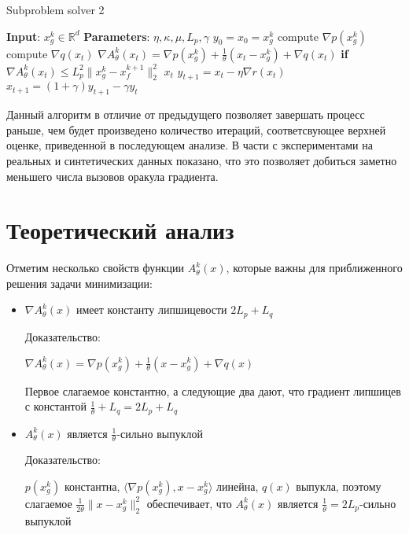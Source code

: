 \documentclass[a4paper,12pt]{extarticle}
\def\<#1,#2>{\langle #1,#2\rangle}
\newcommand{\norm}[1]{\|#1\|_{2}}
\newcommand{\sqn}[1]{\norm{#1}^2}
\begin{document}
\begin{algorithm}[]
    \caption{Subproblem solver 2}
    \begin{algorithmic}[1]

    \STATE{} \textbf{Input}: $x_g^k \in \mathbb{R}^d$
    \STATE{} \textbf{Parameters}: $\eta, \kappa, \mu, L_p, \gamma$
    \STATE{} $y_0 = x_0 = x_g^k$
    \STATE{} compute $\nabla p(x_g^k)$
    \STATE{} compute $\nabla q(x_t)$
    \STATE{} $\nabla A_{\theta}^k(x_t) = \nabla p(x_g^k) + \frac{1}{\theta}(x_t - x_g^k) + \nabla q(x_t)$
    \STATE{} \textbf{if} $\nabla A_{\theta}^k(x_t) \leq L_p^2 \sqn{x_g^k- x_f^{k+1}}$ 
    \RETURN{} $x_{t}$
    \vspace{2ex}
    \STATE{} $y_{t + 1} = x_{t} - \eta \nabla r(x_t)$
    \STATE{} $x_{t + 1} = (1 + \gamma)y_{t+1} - \gamma y_{t}$
    \vspace{0.5ex}
    \ENDFOR{}
    \end{algorithmic}
\end{algorithm}


Данный алгоритм в отличие от предыдущего позволяет завершать процесс раньше,
чем будет произведено количество итераций, соответсвующее верхней оценке,
приведенной в последующем анализе. В части с экспериментами на реальных и синтетических
данных показано, что это позволяет добиться заметно меньшего числа вызовов
оракула градиента. 

\section{Теоретический анализ}




Отметим несколько свойств функции $A_\theta^k(x)$,
которые важны для приближенного решения задачи минимизации:

\begin{itemize}
    \item  $\nabla A_{\theta}^k(x)$ имеет константу липшицевости $2L_p + L_q$
    
    Доказательство:

    
    $\nabla A_\theta^k(x) = \nabla p(x_g^k) + \frac{1}{\theta}(x - x_g^k) + \nabla q(x)$
    
    Первое слагаемое константно, а следующие два дают,
    что градиент липшицев с константой  $\frac{1}{\theta} + L_q = 2L_p + L_q$ 

    \item $A_{\theta}^k(x)$ является $\frac{1}{\theta}$-сильно выпуклой
    
    Доказательство: 

    $p(x_g^k)$ константна, $\<\nabla p(x_g^k),x - x_g^k>$ линейна,
    $q(x)$ выпукла, поэтому слагаемое $\frac{1}{2\theta}\sqn{x - x_g^k}$ обеспечивает, 
    что $A_{\theta}^k(x)$ является $\frac{1}{\theta} = 2L_p$-сильно выпуклой
\end{itemize}
\end{document}
